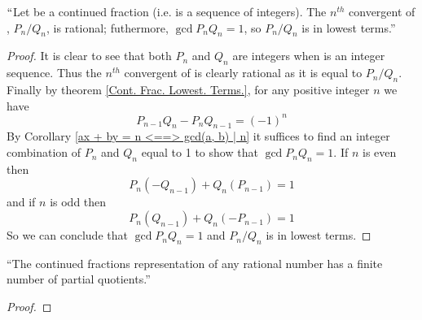         \begin{corollary}
            $``$Let  be a continued fraction (i.e.
             is a sequence of integers). The $n^{th}$
            convergent of , $P_n / Q_n$, is rational;
            futhermore, $\gcd{P_n}{Q_n} = 1$, so $P_n / Q_n$ is in lowest
            terms.''
        \end{corollary}
        \begin{proof}
            It is clear to see that both $P_n$ and $Q_n$ are integers when
             is an integer sequence. Thus the $n^{th}$
            convergent of  is clearly rational as it is equal
            to $P_n / Q_n$. Finally by theorem \ref{Cont. Frac. Lowest. Terms.},
            for any positive integer $n$ we have
            \begin{equation}
                \label{Cont. Frac. GCD Eq 1}
                P_{n - 1} Q_n - P_n Q_{n - 1} = (-1)^n
            \end{equation}
            By Corollary \ref{ax + by = n <==> gcd(a, b) | n} it suffices to find
            an integer combination of $P_n$ and $Q_n$ equal to 1 to show that
            $\gcd{P_n}{Q_n} = 1$. If $n$ is even then
            \begin{equation}
                P_n (-Q_{n - 1}) + Q_n (P_{n - 1}) = 1
            \end{equation}
            and if $n$ is odd then
            \begin{equation}
                P_{n} (Q_{n - 1}) + Q_n(-P_{n - 1}) = 1
            \end{equation}
            So we can conclude that $\gcd{P_n}{Q_n} = 1$ and $P_n / Q_n$ is in
            lowest terms. \QED
        \end{proof}
        \begin{theorem}
            ``The continued fractions representation of any rational number has a finite number
              of partial quotients.''
        \end{theorem}
        \begin{proof}
        \end{proof}
